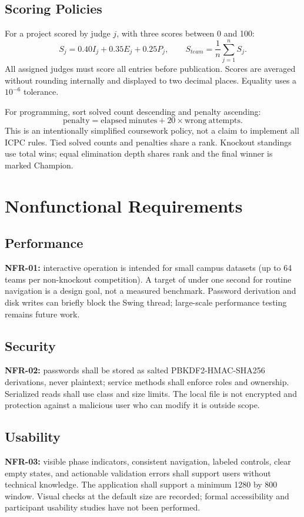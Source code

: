 \subsection*{Scoring Policies}
For a project scored by judge $j$, with three scores between 0 and 100:
\[S_j=0.40I_j+0.35E_j+0.25P_j,\qquad S_{team}=\frac{1}{n}\sum_{j=1}^{n}S_j.\]
All assigned judges must score all entries before publication. Scores are averaged without rounding internally and displayed to two decimal places. Equality uses a $10^{-6}$ tolerance.

For programming, sort solved count descending and penalty ascending:
\[\mathrm{penalty}=\mathrm{elapsed\ minutes}+20\times\mathrm{wrong\ attempts}.\]
This is an intentionally simplified coursework policy, not a claim to implement all ICPC rules. Tied solved counts and penalties share a rank. Knockout standings use total wins; equal elimination depth shares rank and the final winner is marked Champion.

\section{Nonfunctional Requirements}
\subsection{Performance}
\textbf{NFR-01:} interactive operation is intended for small campus datasets (up to 64 teams per non-knockout competition). A target of under one second for routine navigation is a design goal, not a measured benchmark. Password derivation and disk writes can briefly block the Swing thread; large-scale performance testing remains future work.
\subsection{Security}
\textbf{NFR-02:} passwords shall be stored as salted PBKDF2-HMAC-SHA256 derivations, never plaintext; service methods shall enforce roles and ownership. Serialized reads shall use class and size limits. The local file is not encrypted and protection against a malicious user who can modify it is outside scope.
\subsection{Usability}
\textbf{NFR-03:} visible phase indicators, consistent navigation, labeled controls, clear empty states, and actionable validation errors shall support users without technical knowledge. The application shall support a minimum 1280 by 800 window. Visual checks at the default size are recorded; formal accessibility and participant usability studies have not been performed.
